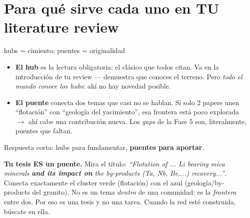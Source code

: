 \documentclass[11pt,a4paper]{article}
\begin{document}
\begin{center}
\end{center}

\section{Para qué sirve cada uno en TU literature review}

\begin{concepto}{hubs = cimiento; puentes = originalidad}
\begin{itemize}
  \item \textbf{El hub} es la lectura obligatoria: el clásico que todos citan. Va en la
        introducción de tu review — demuestra que conoces el terreno. Pero \emph{todo el
        mundo conoce los hubs}: ahí no hay novedad posible.
  \item \textbf{El puente} conecta dos temas que casi no se hablan. Si solo 2 papers unen
        ``flotación'' con ``geología del yacimiento'', esa frontera está poco explorada
        $\rightarrow$ ahí cabe una contribución nueva. Los \emph{gaps} de la Fase 5 son,
        literalmente, puentes que faltan.
\end{itemize}
Respuesta corta: hubs para fundamentar, \textbf{puentes para aportar}.
\end{concepto}

\begin{ojo}
\textbf{Tu tesis ES un puente.} Mira el título: \emph{``Flotation of ... Li bearing mica
minerals \textbf{and its impact on} the by-products (Ta, Nb, Be,...) recovery...''}. Conecta
exactamente el cluster verde (flotación) con el azul (geología/by-products del granito).
No es un tema \emph{dentro} de una comunidad: es la \emph{frontera} entre dos. Por eso es
una tesis y no una tarea. Cuando la red esté construida, búscate en ella.
\end{ojo}
\end{document}
